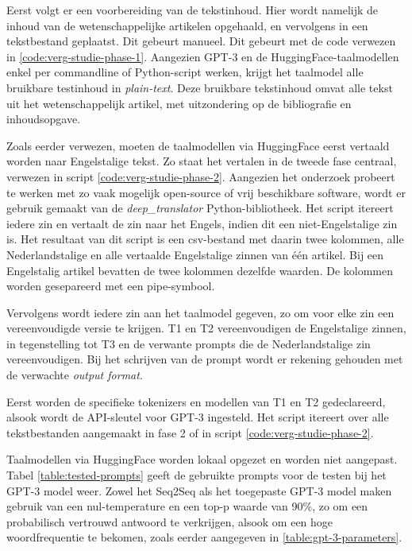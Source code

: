 \medspace

Eerst volgt er een voorbereiding van de tekstinhoud. Hier wordt namelijk de inhoud van de wetenschappelijke artikelen opgehaald, en vervolgens in een tekstbestand geplaatst. Dit gebeurt manueel. Dit gebeurt met de code verwezen in \ref{code:verg-studie-phase-1}. Aangezien GPT-3 en de HuggingFace-taalmodellen enkel per commandline of Python-script werken, krijgt het taalmodel alle bruikbare testinhoud in \textit{plain-text}. Deze bruikbare tekstinhoud omvat alle tekst uit het wetenschappelijk artikel, met uitzondering op de bibliografie en inhoudsopgave.


Zoals eerder verwezen, moeten de taalmodellen via HuggingFace eerst vertaald worden naar Engelstalige tekst. Zo staat het vertalen in de tweede fase centraal, verwezen in script \ref{code:verg-studie-phase-2}. Aangezien het onderzoek probeert te werken met zo vaak mogelijk open-source of vrij beschikbare software, wordt er gebruik gemaakt van de \textit{deep\_translator} Python-bibliotheek. Het script itereert iedere zin en vertaalt de zin naar het Engels, indien dit een niet-Engelstalige zin is. Het resultaat van dit script is een csv-bestand met daarin twee kolommen, alle Nederlandstalige en alle vertaalde Engelstalige zinnen van één artikel. Bij een Engelstalig artikel bevatten de twee kolommen dezelfde waarden. De kolommen worden gesepareerd met een pipe-symbool.

\medspace

Vervolgens wordt iedere zin aan het taalmodel gegeven, zo om voor elke zin een vereenvoudigde versie te krijgen. T1 en T2 vereenvoudigen de Engelstalige zinnen, in tegenstelling tot T3 en de verwante prompts die de Nederlandstalige zin vereenvoudigen. Bij het schrijven van de prompt wordt er rekening gehouden met de verwachte \textit{output format}. 

Eerst worden de specifieke tokenizers en modellen van T1 en T2 gedeclareerd, alsook wordt de API-sleutel voor GPT-3 ingesteld. Het script itereert over alle tekstbestanden aangemaakt in fase 2 of in script \ref{code:verg-studie-phase-2}.



\medspace

Taalmodellen via HuggingFace worden lokaal opgezet en worden niet aangepast. Tabel \ref{table:tested-prompts} geeft de gebruikte prompts voor de testen bij het GPT-3 model weer. Zowel het Seq2Seq als het toegepaste GPT-3 model maken gebruik van een nul-temperature en een top-p waarde van 90\%, zo om een probabilisch vertrouwd antwoord te verkrijgen, alsook om een hoge woordfrequentie te bekomen, zoals eerder aangegeven in \ref{table:gpt-3-parameters}.


